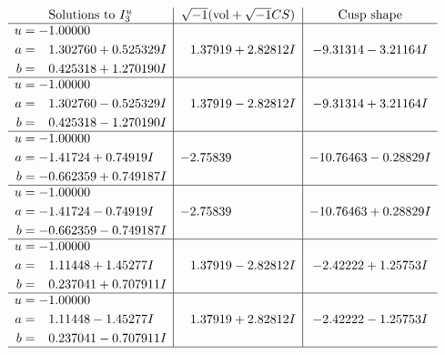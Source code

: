 \documentclass[1p]{elsarticle_modified}
\theoremstyle{definition}
\newcommand{\I}{\sqrt{-1}}
\begin{document}
$$\begin{array}{c|c|c}  
\text{Solutions to }I^u_{3}& \I (\text{vol} + \sqrt{-1}CS) & \text{Cusp shape}\\
 \hline 
\begin{aligned}
u &= -1.00000\phantom{ +0.000000I} \\
a &= \phantom{-}1.302760 + 0.525329 I \\
b &= \phantom{-}0.425318 + 1.270190 I\end{aligned}
 & \phantom{-}1.37919 + 2.82812 I & -9.31314 - 3.21164 I \\ \hline\begin{aligned}
u &= -1.00000\phantom{ +0.000000I} \\
a &= \phantom{-}1.302760 - 0.525329 I \\
b &= \phantom{-}0.425318 - 1.270190 I\end{aligned}
 & \phantom{-}1.37919 - 2.82812 I & -9.31314 + 3.21164 I \\ \hline\begin{aligned}
u &= -1.00000\phantom{ +0.000000I} \\
a &= -1.41724 + 0.74919 I \\
b &= -0.662359 + 0.749187 I\end{aligned}
 & -2.75839\phantom{ +0.000000I} & -10.76463 - 0.28829 I \\ \hline\begin{aligned}
u &= -1.00000\phantom{ +0.000000I} \\
a &= -1.41724 - 0.74919 I \\
b &= -0.662359 - 0.749187 I\end{aligned}
 & -2.75839\phantom{ +0.000000I} & -10.76463 + 0.28829 I \\ \hline\begin{aligned}
u &= -1.00000\phantom{ +0.000000I} \\
a &= \phantom{-}1.11448 + 1.45277 I \\
b &= \phantom{-}0.237041 + 0.707911 I\end{aligned}
 & \phantom{-}1.37919 - 2.82812 I & -2.42222 + 1.25753 I \\ \hline\begin{aligned}
u &= -1.00000\phantom{ +0.000000I} \\
a &= \phantom{-}1.11448 - 1.45277 I \\
b &= \phantom{-}0.237041 - 0.707911 I\end{aligned}
 & \phantom{-}1.37919 + 2.82812 I & -2.42222 - 1.25753 I\\
 \hline 
 \end{array}$$\newpage
\end{document}
